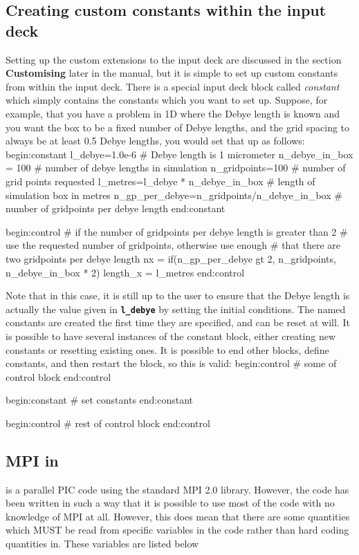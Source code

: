 \documentclass[12pt,a4paper]{article}
\newcommand{\inlinecode}[1]{{\color{warwickred} \bf\texttt{#1}}}
\newcommand{\EPOCH}{{\color{warwickdark}\fontfamily{phv}\selectfont{EPOCH}}}
\newenvironment{boxverbatim}{\lboxverbatim{none}}{\endlboxverbatim}
\begin{document}
\subsection{Creating custom constants within the input deck}
Setting up the custom extensions to the input deck are discussed in the
section {\bf Customising {\EPOCH}} later in the manual, but it is simple to set
up custom constants from within the input deck. There is a special input deck
block called {\it constant} which simply contains the constants which you want
to set up. Suppose, for example, that you have a problem in 1D where the Debye
length is known and you want the box to be a fixed number of Debye lengths,
and the grid spacing to always be at least 0.5 Debye lengths, you would set
that up as follows:
\begin{boxverbatim}
begin:constant
  l_debye=1.0e-6 # Debye length is 1 micrometer
  n_debye_in_box = 100 # number of debye lengths in simulation
  n_gridpoints=100 # number of grid points requested
  l_metres=l_debye * n_debye_in_box # length of simulation box in metres
  n_gp_per_debye=n_gridpoints/n_debye_in_box # number of gridpoints per debye length
end:constant

begin:control
  # if the number of gridpoints per debye length is greater than 2
  # use the requested number of gridpoints, otherwise use enough
  # that there are two gridpoints per debye length
  nx = if(n_gp_per_debye gt 2, n_gridpoints, n_debye_in_box * 2)
  length_x = l_metres
end:control
\end{boxverbatim}

Note that in this case, it is still up to the user to ensure that the Debye
length is actually the value given in \inlinecode{l\_debye} by setting the
initial conditions. The named constants are created the first time they are
specified, and can be reset at will. It is possible to have several instances
of the constant block, either creating new constants or resetting existing
ones. It is possible to end other blocks, define constants, and then
restart the block, so this is valid:
\begin{boxverbatim}
begin:control
   # some of control block
end:control

begin:constant
   # set constants
end:constant

begin:control
   # rest of control block
end:control
\end{boxverbatim}

\subsection{MPI in {\EPOCH}}
\label{sec:mpi}
{\EPOCH} is a parallel PIC code using the standard MPI 2.0 library. However, the
code has been written in such a way that it is possible to use most of the code
with no knowledge of MPI at all. However, this does mean that there are some
quantities which MUST be read from specific variables in the code rather than
hard coding quantities in. These variables are listed below
\end{document}
